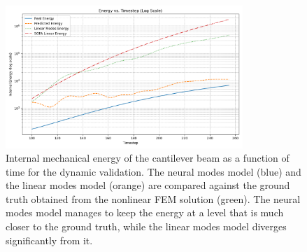 \begin{figure}[htb]
    \centering
    \includegraphics[width=0.8\textwidth]{Images/beam_dynamic_energy.png}
    \caption{Internal mechanical energy of the cantilever beam as a function of time for the dynamic validation. The neural modes model (blue) and the linear modes model (orange) are compared against the ground truth obtained from the nonlinear FEM solution (green). The neural modes model manages to keep the energy at a level that is much closer to the ground truth, while the linear modes model diverges significantly from it.}
    \label{fig:dynamic_validation_energy_comparison}
    \end{figure}





